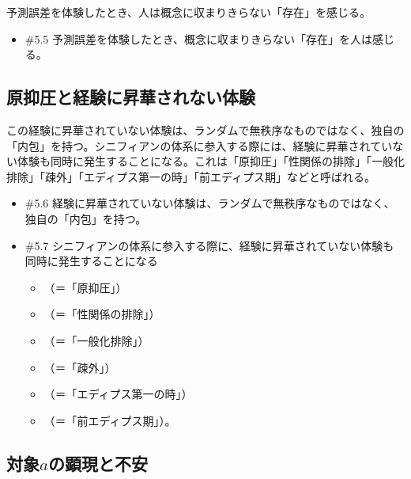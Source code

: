 \mbox{予測誤差}を体験したとき、人は概念に収まりきらない「存在」を感じる。

\begin{note}{}
  \begin{itemize}
    \tightlist
    \item{\#5.5}
      \mbox{予測誤差}を体験したとき、概念に収まりきらない「存在」を人は感じる。
  \end{itemize}
\end{note}

\subsection{原抑圧と経験に昇華されない体験}\label{ux539fux6291ux5727ux3068ux7d4cux9a13ux306bux6607ux83efux3055ux308cux306aux3044ux4f53ux9a13}

この経験に昇華されていない体験は、ランダムで無秩序なものではなく、独自の「内包」を持つ。シニフィアンの体系に参入する際には、経験に昇華されていない体験も同時に発生することになる。これは「原抑圧」「性関係の排除」「一般化排除」「疎外」「エディプス第一の時」「前エディプス期」などと呼ばれる。

\begin{note}{}
  \begin{itemize}
    \tightlist
    \item{\#5.6}
      経験に昇華されていない体験は、ランダムで無秩序なものではなく、独自の「内包」を持つ。
    \item{\#5.7}
      シニフィアンの体系に参入する際に、経験に昇華されていない体験も同時に発生することになる
      \begin{itemize}
          \tightlist
          \item
          （＝「原抑圧」）
          \item
          （＝「性関係の排除」）
          \item
          （＝「一般化排除」）
          \item
          （＝「疎外」）
          \item
          （＝「エディプス第一の時」）  
          \item
          （＝「前エディプス期」）。
        \end{itemize}
  \end{itemize}
\end{note}

\subsection{\texorpdfstring{対象\(a\)の顕現と不安}{対象aの顕現と不安}}\label{ux5bfeux8c61aux306eux9855ux73feux3068ux4e0dux5b89}

